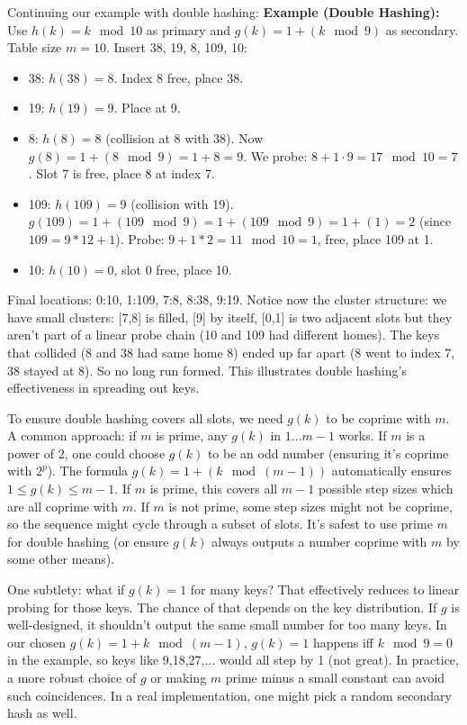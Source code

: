 \documentclass[11pt]{article}
\begin{document}
Continuing our example with double hashing:
\textbf{Example (Double Hashing):} Use $h(k) = k \mod 10$ as primary and $g(k) = 1 + (k \mod 9)$ as secondary. Table size $m=10$. Insert 38, 19, 8, 109, 10:
\begin{itemize}
  \item 38: $h(38)=8$. Index 8 free, place 38.
  \item 19: $h(19)=9$. Place at 9.
  \item 8: $h(8)=8$ (collision at 8 with 38). Now $g(8) = 1 + (8 \mod 9) = 1+8=9$. We probe: $8 + 1\cdot 9 = 17 \mod 10 = 7$. Slot 7 is free, place 8 at index 7.
  \item 109: $h(109)=9$ (collision with 19). $g(109) = 1 + (109 \mod 9) = 1 + (109 \mod 9) = 1 + (1) = 2$ (since $109=9*12+1$). Probe: $9 + 1*2 = 11 \mod 10 = 1$, free, place 109 at 1.
  \item 10: $h(10)=0$, slot 0 free, place 10.
\end{itemize}
Final locations: 0:10, 1:109, 7:8, 8:38, 9:19. Notice now the cluster structure: we have small clusters: [7,8] is filled, [9] by itself, [0,1] is two adjacent slots but they aren’t part of a linear probe chain (10 and 109 had different homes). The keys that collided (8 and 38 had same home 8) ended up far apart (8 went to index 7, 38 stayed at 8). So no long run formed. This illustrates double hashing’s effectiveness in spreading out keys.

To ensure double hashing covers all slots, we need $g(k)$ to be coprime with $m$. A common approach: if $m$ is prime, any $g(k)$ in $1\ldots m-1$ works. If $m$ is a power of 2, one could choose $g(k)$ to be an odd number (ensuring it’s coprime with $2^p$). The formula $g(k) = 1 + (k \mod (m-1))$ automatically ensures $1 \le g(k) \le m-1$. If $m$ is prime, this covers all $m-1$ possible step sizes which are all coprime with $m$. If $m$ is not prime, some step sizes might not be coprime, so the sequence might cycle through a subset of slots. It’s safest to use prime $m$ for double hashing (or ensure $g(k)$ always outputs a number coprime with $m$ by some other means).

One subtlety: what if $g(k)=1$ for many keys? That effectively reduces to linear probing for those keys. The chance of that depends on the key distribution. If $g$ is well-designed, it shouldn’t output the same small number for too many keys. In our chosen $g(k)=1+k \mod (m-1)$, $g(k)=1$ happens iff $k \mod 9 = 0$ in the example, so keys like 9,18,27,... would all step by 1 (not great). In practice, a more robust choice of $g$ or making $m$ prime minus a small constant can avoid such coincidences. In a real implementation, one might pick a random secondary hash as well.
\end{document}

